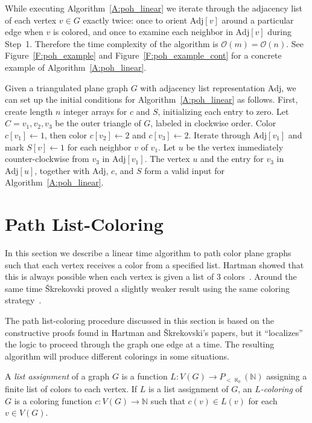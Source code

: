 \documentclass[12pt,letterpaper]{article}
\theoremstyle{plain}
\theoremstyle{definition}
\theoremstyle{break}
\newcommand{\defterm}[1]{\emph{#1}} %
\begin{document}
While executing Algorithm~\ref{A:poh_linear} we iterate through
the adjacency list of each vertex $v\in G$ exactly twice: once to
orient $\text{Adj}[v]$
around a particular edge when $v$ is colored,
and once to examine each neighbor in $\text{Adj}[v]$ during Step~1.
Therefore the time complexity of the algorithm is
$\mathcal{O}(m)=\mathcal{O}(n)$. See Figure~\ref{F:poh_example} 
and Figure~\ref{F:poh_example_cont} for a concrete example of
Algorithm~\ref{A:poh_linear}.

Given a triangulated plane graph $G$ with adjacency list representation
$\text{Adj}$, we can set up the initial conditions for
Algorithm~\ref{A:poh_linear} as follows. First, create length $n$ integer
arrays for $c$ and $S$, initializing each entry to zero.
Let $C=v_1,v_2,v_3$ be the outer triangle of $G$,
labeled in clockwise order.
Color $c[v_1]\leftarrow 1$, then color $c[v_2]\leftarrow 2$ and
$c[v_3]\leftarrow 2$.
Iterate through $\text{Adj}[v_1]$ and mark $S[v]\leftarrow 1$ for each
neighbor $v$ of $v_1$.
Let $u$ be the vertex immediately counter-clockwise from $v_3$ in
$\text{Adj}[v_1]$. The vertex $u$ and the entry for $v_3$ in $\text{Adj}[u]$,
together with $\text{Adj}$, $c$, and $S$ form a valid input for
Algorithm~\ref{A:poh_linear}.

\section{Path List-Coloring}

In this section we describe a linear time algorithm to path color
plane graphs such that each vertex receives a color from a specified list.
Hartman showed that this is always possible when each vertex is given a
list of $3$ colors~\cite[Thm.~4.1]{Har1997}. Around the same
time \v{S}krekovski proved a
slightly weaker result using the same coloring
strategy~\cite[Thm.~2.2b]{Skr1999}.

The path list-coloring procedure discussed in this section is
based on the constructive proofs found in Hartman and
\v{S}krekovski's papers, but it ``localizes'' the logic to proceed through the
graph one edge at a time. The resulting algorithm
will produce different colorings in some situations.

A \defterm{list assignment} of a graph $G$ is
a function $L:V(G)\to P_{<\aleph_0}(\mathbb{N})$ assigning
a finite list of colors to each vertex. If $L$ is a list assignment of $G$,
an \defterm{$L$-coloring} of $G$ is a coloring function
$c:V(G)\to\mathbb{N}$ such that $c(v)\in L(v)$ for each $v\in V(G)$.
\end{document}
